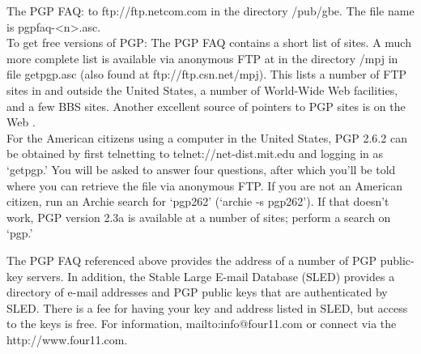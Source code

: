 \begin{htmllist}
    The PGP FAQ:
    to ftp://ftp.netcom.com in the directory /pub/gbe. The file name is
    pgpfaq-<n>.asc.\\
    
    To get free versions of PGP: The PGP FAQ contains a short list of
    sites. A much more complete list is available via anonymous FTP at
     in the directory
    /mpj in file getpgp.asc (also found at ftp://ftp.csn.net/mpj). This
    lists a number of FTP sites in and outside the United States, a number
    of World-Wide Web facilities, and a few BBS sites. Another excellent
    source of pointers to PGP sites is on the Web .\\

    For the American citizens using a computer in the United States, PGP
    2.6.2 can be obtained by first telnetting to telnet://net-dist.mit.edu
    and logging in as `getpgp.' You will be asked to answer four questions,
    after which you'll be told where you can retrieve the file via
    anonymous FTP. If you are not an American citizen, run an Archie search
    for `pgp262' (`archie -s pgp262'). If that doesn't work, PGP version
    2.3a is available at a number of sites; perform a search on `pgp.'

  \item[Public Key Directories]
    The PGP FAQ referenced above provides the address of a number of PGP
    public-key servers. In addition, the Stable Large E-mail Database
    (SLED) provides a directory of e-mail addresses and PGP public keys
    that are authenticated by SLED. There is a fee for having your key and
    address listed in SLED, but access to the keys is free. For
    information, 
    {mailto:info@four11.com} or connect via the 
    {http://www.four11.com}.
\end{htmllist}
